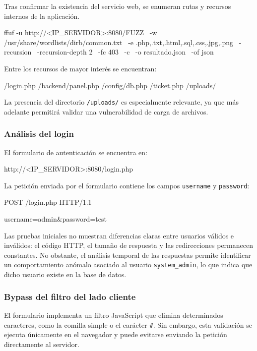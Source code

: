 Tras confirmar la existencia del servicio web, se enumeran rutas y recursos internos de la aplicación.

\begin{bashbox}
ffuf -u http://<IP_SERVIDOR>:8080/FUZZ \
-w /usr/share/wordlists/dirb/common.txt \
-e .php,.txt,.html,.sql,.css,.jpg,.png \
-recursion \
-recursion-depth 2 \
-fc 403 \
-c \
-o resultado.json \
-of json
\end{bashbox}

Entre los recursos de mayor interés se encuentran:

\begin{configbox}
/login.php
/backend/panel.php
/config/db.php
/ticket.php
/uploads/
\end{configbox}

La presencia del directorio \texttt{/uploads/} es especialmente relevante, ya que más adelante permitirá validar una vulnerabilidad de carga de archivos.

\subsubsection*{Análisis del login}

El formulario de autenticación se encuentra en:

\begin{configbox}
http://<IP_SERVIDOR>:8080/login.php
\end{configbox}

La petición enviada por el formulario contiene los campos \texttt{username} y \texttt{password}:

\begin{configbox}
POST /login.php HTTP/1.1

username=admin&password=test
\end{configbox}

Las pruebas iniciales no muestran diferencias claras entre usuarios válidos e inválidos: el código HTTP, el tamaño de respuesta y las redirecciones permanecen constantes. No obstante, el análisis temporal de las respuestas permite identificar un comportamiento anómalo asociado al usuario \texttt{system\_admin}, lo que indica que dicho usuario existe en la base de datos.

\subsubsection*{Bypass del filtro del lado cliente}

El formulario implementa un filtro JavaScript que elimina determinados caracteres, como la comilla simple o el carácter \texttt{\#}. Sin embargo, esta validación se ejecuta únicamente en el navegador y puede evitarse enviando la petición directamente al servidor.

